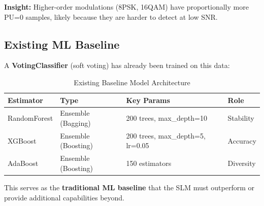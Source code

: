 \documentclass[12pt, a4paper]{article}
\begin{document}

\textbf{Insight:} Higher-order modulations (8PSK, 16QAM) have proportionally more PU=0 samples, likely because they are harder to detect at low SNR.


\subsection{Existing ML Baseline}

A \textbf{VotingClassifier} (soft voting) has already been trained on this data:

\begin{table}[H]
\centering
\caption{Existing Baseline Model Architecture}
\label{tab:baseline}
\begin{tabular}{@{}llll@{}}
\toprule
\textbf{Estimator}   & \textbf{Type}        & \textbf{Key Params}           & \textbf{Role} \\
\midrule
RandomForest         & Ensemble (Bagging)   & 200 trees, max\_depth=10      & Stability \\
XGBoost              & Ensemble (Boosting)  & 200 trees, max\_depth=5, lr=0.05 & Accuracy \\
AdaBoost             & Ensemble (Boosting)  & 150 estimators                & Diversity \\
\bottomrule
\end{tabular}
\end{table}

This serves as the \textbf{traditional ML baseline} that the SLM must outperform or provide additional capabilities beyond.
\end{document}
